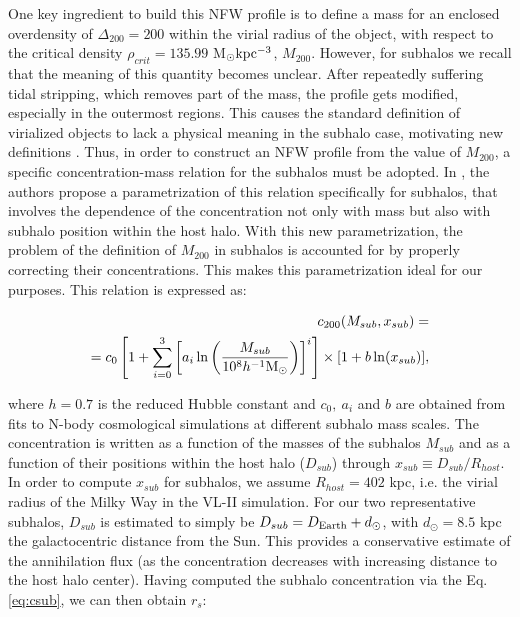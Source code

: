 \documentclass[%
 reprint,
nofootinbib,
 amsmath,amssymb,
 aps,
]{revtex4-2}
\begin{document}
One key ingredient to build this NFW profile is to define a mass for an enclosed overdensity of $\Delta_{200} = 200$ within the virial radius of the object, with respect to the critical density $\rho_{crit}=135.99$ M$_{\odot} \rm kpc^{-3}$, $M_{200}$. However, for subhalos we recall that the meaning of this quantity becomes unclear. After repeatedly suffering tidal stripping, which removes part of the mass, the profile gets modified, especially in the outermost regions. This causes the standard definition of virialized objects to lack a physical meaning in the subhalo case, motivating new definitions \cite{Moline+17}. Thus, in order to construct an NFW profile from the value of $M_{200}$, a specific concentration-mass relation for the subhalos must be adopted. In \cite{Moline+17}, the authors propose a parametrization of this relation specifically for subhalos, that involves the dependence of the concentration not only with mass but also with subhalo position within the host halo. With this new parametrization, the problem of the definition of $M_{200}$ in subhalos is accounted for by properly correcting their concentrations. This makes this parametrization ideal for our purposes. This relation is expressed as: %

\begin{equation}
\begin{split}
    c_{200}(M_{sub},x_{sub})=\\=c_0 \left[ 1 + \sum_{i=0}^3 \left[a_i \ln\left(\frac{M_{sub}}{10^8 h^{-1} \rm M_\odot}\right)\right]^i\right]\times [1+b\ln(x_{sub})],
    \label{eq:csub}
\end{split}
\end{equation}

where $h = 0.7$ is the reduced Hubble constant and $c_0,\ a_i$ and $b$ are obtained from fits to N-body cosmological simulations at different subhalo mass scales. The concentration is written as a function of the masses of the subhalos $M_{sub}$ and as a function of their positions within the host halo ($D_{sub}$) through $x_{sub} \equiv D_{sub}/R_{host}$. In order to compute $x_{sub}$ for subhalos, we assume $R_{host} = 402$ kpc, i.e. the virial radius of the Milky Way in the VL-II simulation. For our two representative subhalos, $D_{sub}$ is estimated to simply be $D_{sub}= D_{\rm Earth} + d_{\odot}$, with $d_{\odot}=8.5$ kpc the galactocentric distance from the Sun. This provides a conservative estimate of the annihilation flux (as the concentration decreases with increasing distance to the host halo center). Having computed the subhalo concentration via the Eq. \ref{eq:csub}, we can then obtain $r_s$: 
\end{document}

